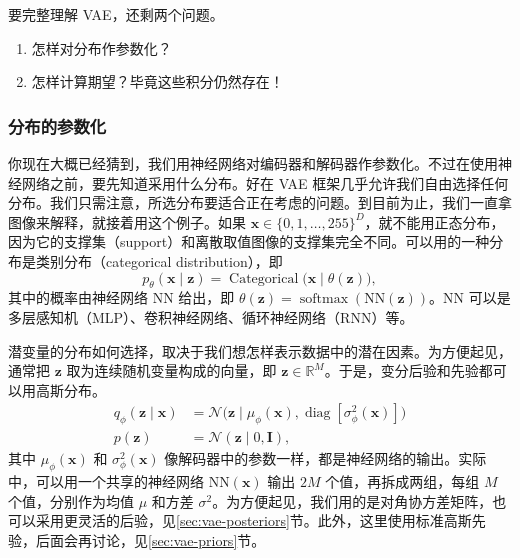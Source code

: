 
要完整理解 VAE，还剩两个问题。
\begin{enumerate}
\item 怎样对分布作参数化？
\item 怎样计算期望？毕竟这些积分仍然存在！
\end{enumerate}

\subsubsection{分布的参数化}
你现在大概已经猜到，我们用神经网络对编码器和解码器作参数化。不过在使用神经网络之前，要先知道采用什么分布。好在 VAE 框架几乎允许我们自由选择任何分布。我们只需注意，所选分布要适合正在考虑的问题。到目前为止，我们一直拿图像来解释，就接着用这个例子。如果 $\mathbf{x}\in\{0,1,\ldots,255\}^D$，就不能用正态分布，因为它的支撑集（support）和离散取值图像的支撑集完全不同。可以用的一种分布是类别分布（categorical distribution），即
\begin{equation}
p_\theta(\mathbf{x}\mid\mathbf{z})=\operatorname{Categorical}\bigl(\mathbf{x}\mid\theta(\mathbf{z})\bigr),
\tag{5.27}\label{eq:05-27}
\end{equation}
其中的概率由神经网络 $\mathrm{NN}$ 给出，即 $\theta(\mathbf{z})=\operatorname{softmax}(\mathrm{NN}(\mathbf{z}))$。$\mathrm{NN}$ 可以是多层感知机（MLP）、卷积神经网络、循环神经网络（RNN）等。

潜变量的分布如何选择，取决于我们想怎样表示数据中的潜在因素。为方便起见，通常把 $\mathbf{z}$ 取为连续随机变量构成的向量，即 $\mathbf{z}\in\mathbb{R}^M$。于是，变分后验和先验都可以用高斯分布。
\begin{align}
q_\phi(\mathbf{z}\mid\mathbf{x})&=\mathcal{N}\bigl(\mathbf{z}\mid\mu_\phi(\mathbf{x}),
                           \operatorname{diag}[\sigma^2_\phi(\mathbf{x})]\bigr)
                          \tag{5.28}\label{eq:05-28}\\
p(\mathbf{z})&=\mathcal{N}(\mathbf{z}\mid 0,\mathbf{I}), \tag{5.29}\label{eq:05-29}
\end{align}
其中 $\mu_\phi(\mathbf{x})$ 和 $\sigma^2_\phi(\mathbf{x})$ 像解码器中的参数一样，都是神经网络的输出。实际中，可以用一个共享的神经网络 $\mathrm{NN}(\mathbf{x})$ 输出 $2M$ 个值，再拆成两组，每组 $M$ 个值，分别作为均值 $\mu$ 和方差 $\sigma^2$。为方便起见，我们用的是对角协方差矩阵，也可以采用更灵活的后验，见\ref{sec:vae-posteriors}节。此外，这里使用标准高斯先验，后面会再讨论，见\ref{sec:vae-priors}节。

